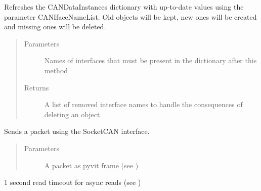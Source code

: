 \documentclass[letterpaper,10pt,english]{sphinxmanual}
\begin{document}
\begin{fulllineitems}
\begin{fulllineitems}
\label{\detokenize{src:src.CANData.CANData.rebuildCANDataInstances}}
Refreshes the CANDataInstances dictionary with up-to-date values using the parameter CANIfaceNameList.
Old objects will be kept, new ones will be created and missing ones will be deleted.
\begin{quote}\begin{description}
\item[{Parameters}] \leavevmode
{} \textendash{} Names of interfaces that must be present in the dictionary after this method

\item[{Returns}] \leavevmode
A list of removed interface names to handle the consequences of deleting an object.

\end{description}\end{quote}

\end{fulllineitems}


\begin{fulllineitems}
\label{\detokenize{src:src.CANData.CANData.sendPacket}}
Sends a packet using the SocketCAN interface.
\begin{quote}\begin{description}
\item[{Parameters}] \leavevmode
{} \textendash{} A packet as pyvit frame (see {\hyperref[\detokenize{src:src.CANData.CANData.tryBuildPacket}]{}})

\end{description}\end{quote}

\end{fulllineitems}


\begin{fulllineitems}
\label{\detokenize{src:src.CANData.CANData.timeout}}
1 second read timeout for async reads (see {\hyperref[\detokenize{src:src.CANData.CANData.readPacketAsync}]{}})


\end{fulllineitems}
\end{fulllineitems}
\end{document}
